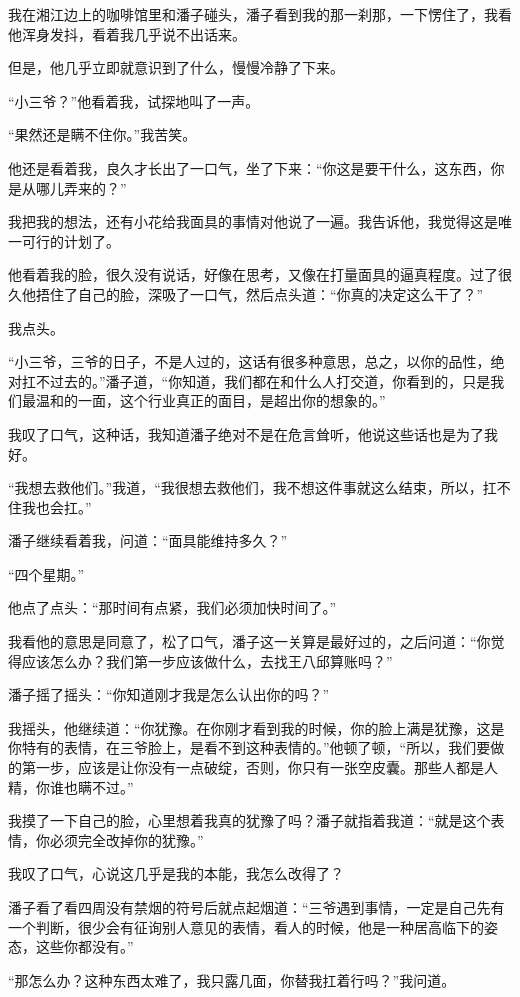 我在湘江边上的咖啡馆里和潘子碰头，潘子看到我的那一刹那，一下愣住了，我看他浑身发抖，看着我几乎说不出话来。

但是，他几乎立即就意识到了什么，慢慢冷静了下来。

“小三爷？”他看着我，试探地叫了一声。

“果然还是瞒不住你。”我苦笑。

他还是看着我，良久才长出了一口气，坐了下来：“你这是要干什么，这东西，你是从哪儿弄来的？”

我把我的想法，还有小花给我面具的事情对他说了一遍。我告诉他，我觉得这是唯一可行的计划了。

他看着我的脸，很久没有说话，好像在思考，又像在打量面具的逼真程度。过了很久他捂住了自己的脸，深吸了一口气，然后点头道：“你真的决定这么干了？”

我点头。

“小三爷，三爷的日子，不是人过的，这话有很多种意思，总之，以你的品性，绝对扛不过去的。”潘子道，“你知道，我们都在和什么人打交道，你看到的，只是我们最温和的一面，这个行业真正的面目，是超出你的想象的。”

我叹了口气，这种话，我知道潘子绝对不是在危言耸听，他说这些话也是为了我好。

“我想去救他们。”我道，“我很想去救他们，我不想这件事就这么结束，所以，扛不住我也会扛。”

潘子继续看着我，问道：“面具能维持多久？”

“四个星期。”

他点了点头：“那时间有点紧，我们必须加快时间了。”

我看他的意思是同意了，松了口气，潘子这一关算是最好过的，之后问道：“你觉得应该怎么办？我们第一步应该做什么，去找王八邱算账吗？”

潘子摇了摇头：“你知道刚才我是怎么认出你的吗？”

我摇头，他继续道：“你犹豫。在你刚才看到我的时候，你的脸上满是犹豫，这是你特有的表情，在三爷脸上，是看不到这种表情的。”他顿了顿，“所以，我们要做的第一步，应该是让你没有一点破绽，否则，你只有一张空皮囊。那些人都是人精，你谁也瞒不过。”

我摸了一下自己的脸，心里想着我真的犹豫了吗？潘子就指着我道：“就是这个表情，你必须完全改掉你的犹豫。”

我叹了口气，心说这几乎是我的本能，我怎么改得了？

潘子看了看四周没有禁烟的符号后就点起烟道：“三爷遇到事情，一定是自己先有一个判断，很少会有征询别人意见的表情，看人的时候，他是一种居高临下的姿态，这些你都没有。”

“那怎么办？这种东西太难了，我只露几面，你替我扛着行吗？”我问道。

